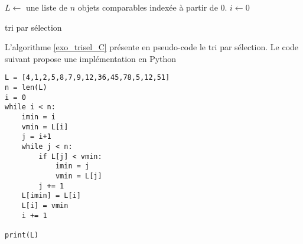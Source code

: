 \begin{algorithm}
  $L \leftarrow$ une liste de $n$ objets comparables indexée à partir de $0$.\;
  $i\leftarrow 0$\;
  \label{exo_trisel_C}
  \caption{tri par sélection}
\end{algorithm}
L'algorithme \ref{exo_trisel_C} présente en pseudo-code le tri par sélection. Le code suivant propose une implémentation en Python
\begin{verbatim}
L = [4,1,2,5,8,7,9,12,36,45,78,5,12,51]
n = len(L)
i = 0
while i < n:
    imin = i
    vmin = L[i]
    j = i+1
    while j < n:
        if L[j] < vmin:
            imin = j
            vmin = L[j]
        j += 1
    L[imin] = L[i]
    L[i] = vmin
    i += 1
    
print(L)
\end{verbatim}
